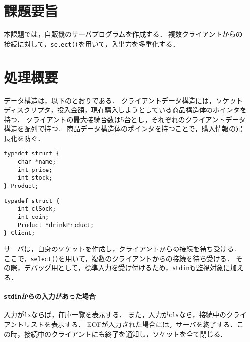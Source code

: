 \documentclass[12pt,dvipdfmx]{jlreq}
\begin{document}
\section*{課題要旨}
本課題では，自販機のサーバプログラムを作成する．
複数クライアントからの接続に対して，\texttt{select()}を用いて，入出力を多重化する．
\section*{処理概要}
データ構造は，以下のとおりである．
クライアントデータ構造には，ソケットディスクリプタ，投入金額，現在購入しようとしている商品構造体のポインタを持つ．
クライアントの最大接続台数は5台とし，それぞれのクライアントデータ構造を配列で持つ．
商品データ構造体のポインタを持つことで，購入情報の冗長化を防ぐ．
\begin{center}
    \begin{minipage}[t]{.48\textwidth}
        \begin{lstlisting}[caption=商品構造]
typedef struct {
    char *name;
    int price;
    int stock;
} Product;
        \end{lstlisting}
    \end{minipage}
    \begin{minipage}[t]{.48\textwidth}
        \begin{lstlisting}[caption=クライアント構造]
typedef struct {
    int clSock;
    int coin;
    Product *drinkProduct;
} Client;
        \end{lstlisting}
    \end{minipage}
\end{center}
サーバは，自身のソケットを作成し，クライアントからの接続を待ち受ける．
ここで，\texttt{select()}を用いて，複数のクライアントからの接続を待ち受ける．
その際，デバッグ用として，標準入力を受け付けるため，\texttt{stdin}も監視対象に加える．
\paragraph{\texttt{stdin}からの入力があった場合}入力が\texttt{ls}ならば，在庫一覧を表示する．
また，入力が\texttt{cls}なら，接続中のクライアントリストを表示する．
EOFが入力された場合には，サーバを終了する．この時，接続中のクライアントにも終了を通知し，ソケットを全て閉じる．
\end{document}
